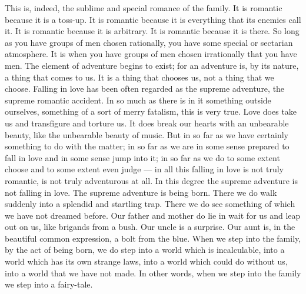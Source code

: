 This is, indeed, the sublime and special romance of the family. It is romantic because it is a toss-up. It is romantic because it is everything that its enemies call it. It is romantic because it is arbitrary. It is romantic because it is there. So long as you have groups of men chosen rationally, you have some special or sectarian atmosphere. It is when you have groups of men chosen irrationally that you have men. The element of adventure begins to exist; for an adventure is, by its nature, a thing that comes to us. It is a thing that chooses us, not a thing that we choose. Falling in love has been often regarded as the supreme adventure, the supreme romantic accident. In so much as there is in it something outside ourselves, something of a sort of merry fatalism, this is very true. Love does take us and transfigure and torture us. It does break our hearts with an unbearable beauty, like the unbearable beauty of music. But in so far as we have certainly something to do with the matter; in so far as we are in some sense prepared to fall in love and in some sense jump into it; in so far as we do to some extent choose and to some extent even judge — in all this falling in love is not truly romantic, is not truly adventurous at all. In this degree the supreme adventure is not falling in love. The supreme adventure is being born. There we do walk suddenly into a splendid and startling trap. There we do see something of which we have not dreamed before. Our father and mother do lie in wait for us and leap out on us, like brigands from a bush. Our uncle is a surprise. Our aunt is, in the beautiful common expression, a bolt from the blue. When we step into the family, by the act of being born, we do step into a world which is incalculable, into a world which has its own strange laws, into a world which could do without us, into a world that we have not made. In other words, when we step into the family we step into a fairy-tale.

